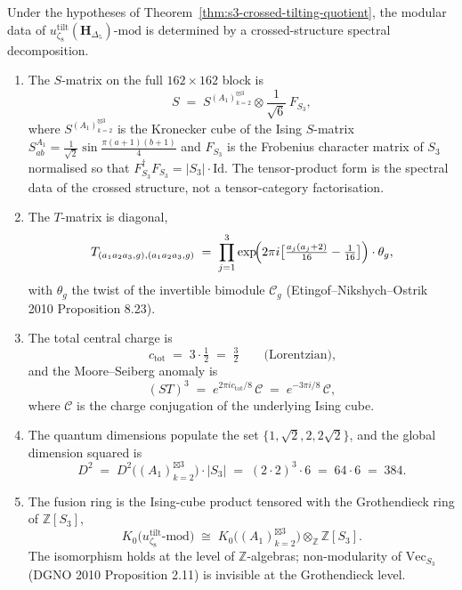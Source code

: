 \begin{proposition}
\label{prop:modular-data-zeta8-tilting}
Under the hypotheses of Theorem~\ref{thm:s3-crossed-tilting-quotient},
the modular data of $u_{\zeta_8}^{\mathrm{tilt}}(\mathbf{H}_{\Delta_5})$-$\mathrm{mod}$ is determined by a crossed-structure spectral decomposition.
\begin{enumerate}
\item The $S$-matrix on the full $162\times 162$ block is
\[
 S \;=\; S^{(A_1)_{k=2}^{\boxtimes 3}}\otimes\frac{1}{\sqrt{6}}\,F_{S_3},
\]
where $S^{(A_1)_{k=2}^{\boxtimes 3}}$ is the Kronecker cube of the Ising $S$-matrix $S^{A_1}_{ab} = \tfrac{1}{\sqrt{2}}\sin\tfrac{\pi(a+1)(b+1)}{4}$ and $F_{S_3}$ is the Frobenius character matrix of $S_3$ normalised so that $F_{S_3}^{\dagger}F_{S_3} = |S_3|\cdot\mathrm{Id}$. The tensor-product form is the spectral data of the crossed structure, not a tensor-category factorisation.
\item The $T$-matrix is diagonal,
\[
 T_{(a_1a_2a_3,g),(a_1a_2a_3,g)}
 \;=\;
 \prod_{j=1}^{3}\exp\!\Bigl(2\pi i\bigl[\tfrac{a_j(a_j+2)}{16} - \tfrac{1}{16}\bigr]\Bigr)\cdot\theta_g,
\]
with $\theta_g$ the twist of the invertible bimodule $\mathcal{C}_g$ (Etingof--Nikshych--Ostrik 2010 Proposition 8.23).
\item The total central charge is
\[
 c_{\mathrm{tot}} \;=\; 3\cdot\tfrac{1}{2} \;=\; \tfrac{3}{2}
 \qquad\text{(Lorentzian),}
\]
and the Moore--Seiberg anomaly is
\[
 (ST)^{3} \;=\; e^{2\pi i c_{\mathrm{tot}}/8}\,\mathcal{C} \;=\; e^{-3\pi i/8}\,\mathcal{C},
\]
where $\mathcal{C}$ is the charge conjugation of the underlying Ising cube.
\item The quantum dimensions populate the set $\{1,\sqrt{2},2,2\sqrt{2}\}$, and the global dimension squared is
\[
 D^{2} \;=\; D^{2}\bigl((A_1)_{k=2}^{\boxtimes 3}\bigr)\cdot|S_3|
 \;=\; (2\cdot 2)^{3}\cdot 6
 \;=\; 64\cdot 6
 \;=\; 384.
\]
\item The fusion ring is the Ising-cube product tensored with the Grothendieck ring of $\mathbb{Z}[S_3]$,
\[
 K_0\bigl(u_{\zeta_8}^{\mathrm{tilt}}\text{-}\mathrm{mod}\bigr)
 \;\cong\;
 K_0\bigl((A_1)_{k=2}^{\boxtimes 3}\bigr)\otimes_{\mathbb{Z}}\mathbb{Z}[S_3].
\]
The isomorphism holds at the level of $\mathbb{Z}$-algebras; non-modularity of $\mathrm{Vec}_{S_3}$ (DGNO 2010 Proposition 2.11) is invisible at the Grothendieck level.
\end{enumerate}
\end{proposition}

